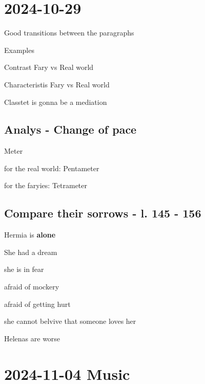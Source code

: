 \section{2024-10-29}

\startitemize[packed]
\item Good transitions between the paragraphs
\item Examples
\item Contrast Fary vs Real world
\item Characteristis Fary vs Real world
\stopitemize

\startframedtipp
Classtet is gonna be a mediation
\stopframedtipp

\subsection{Analys - Change of pace}

\startplacetable[location={here},title={Notes for the analysis}]
\bTABLE
\bTR
\bTD Meter \eTD
\bTD

\startitemize[packed]
\item for the real world: Pentameter
\item for the faryies: Tetrameter
\stopitemize

\eTD
\eTR
\eTABLE
\stopplacetable

\subsection{Compare their sorrows - l. 145 - 156}

\startitemize[packed]
\item Hermia is {\bf alone}
\item She had a dream
\item she is in fear
\item afraid of mockery
\item afraid of getting hurt
\item she cannot belvive that someone loves her 
\stopitemize

Helenas are worse



\section{2024-11-04 Music}


